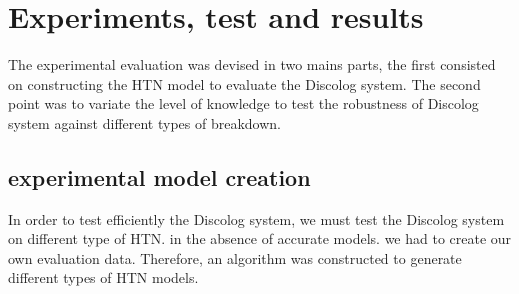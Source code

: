 \chapter{Experiments, test and results} %

\label{Chapter 6} %

The experimental evaluation was devised in two mains parts, the first consisted on constructing the HTN model to evaluate the Discolog system. The second point was to variate the level of knowledge to test the robustness of  Discolog system against different types of breakdown. 

\section{experimental model creation}
In order to test efficiently the Discolog system, we must test the Discolog system on different type of HTN. in the absence of accurate models. we had to create our own evaluation data. Therefore, an algorithm was constructed to generate different types of HTN models. 

